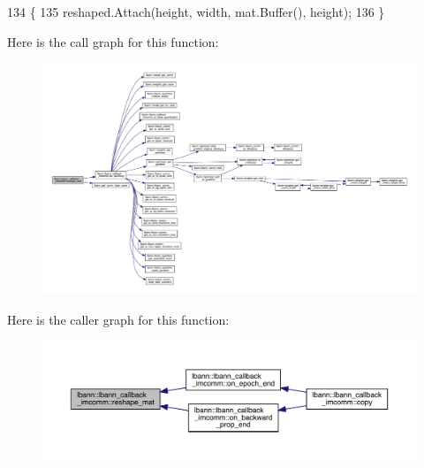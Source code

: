 \begin{DoxyCode}
134                                                                        \{
135     reshaped.Attach(height, width, mat.Buffer(), height);
136   \}
\end{DoxyCode}
Here is the call graph for this function\+:\nopagebreak
\begin{figure}[H]
\begin{center}
\leavevmode
\includegraphics[width=350pt]{classlbann_1_1lbann__callback__imcomm_a13fe710b841f72e28daf8de029f6c2f9_cgraph}
\end{center}
\end{figure}
Here is the caller graph for this function\+:\nopagebreak
\begin{figure}[H]
\begin{center}
\leavevmode
\includegraphics[width=350pt]{classlbann_1_1lbann__callback__imcomm_a13fe710b841f72e28daf8de029f6c2f9_icgraph}
\end{center}
\end{figure}
\mbox{\label{classlbann_1_1lbann__callback__imcomm_a5e0f7d9f85da8d2e579dbe4092bc3100}} 
